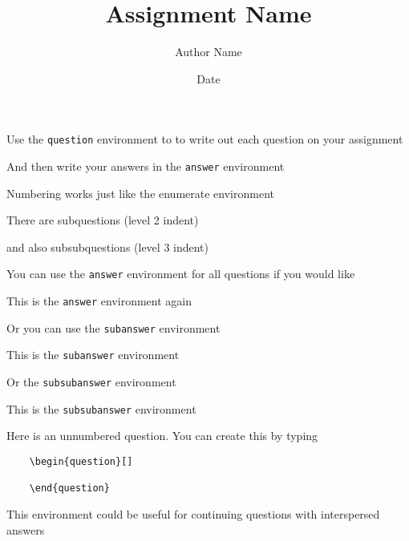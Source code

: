 \documentclass{gerot-assignment}
\title{Assignment Name}
\author{Author Name}
\date{Date} %
\begin{document}
\maketitle

\begin{question}
    Use the \verb|question| environment to to write out each question on your assignment
\end{question}
\begin{answer}
    And then write your answers in the \verb|answer| environment
\end{answer}

\begin{question}
    Numbering works just like the enumerate environment
\end{question}
\begin{subquestion}
    There are subquestions (level 2 indent)
\end{subquestion}
\begin{subsubquestion}
    and also subsubquestions (level 3 indent)
\end{subsubquestion}
\begin{subquestion}
    You can use the \verb|answer| environment for all questions if you would like
\end{subquestion}
\begin{answer}
    This is the \verb|answer| environment again
\end{answer}

\begin{subquestion}
    Or you can use the \verb|subanswer| environment
\end{subquestion}
\begin{subanswer}
    This is the \verb|subanswer| environment
\end{subanswer}

\begin{subsubquestion}
    Or the \verb|subsubanswer| environment
\end{subsubquestion}
\begin{subsubanswer}
    This is the \verb|subsubanswer| environment
\end{subsubanswer}

\begin{question}[]
Here is an unnumbered question. You can create this by typing
\begin{verbatim}
    \begin{question}[]
    
    \end{question}
\end{verbatim}
This environment could be useful for continuing questions with interspersed answers
\end{question}
\end{document}
